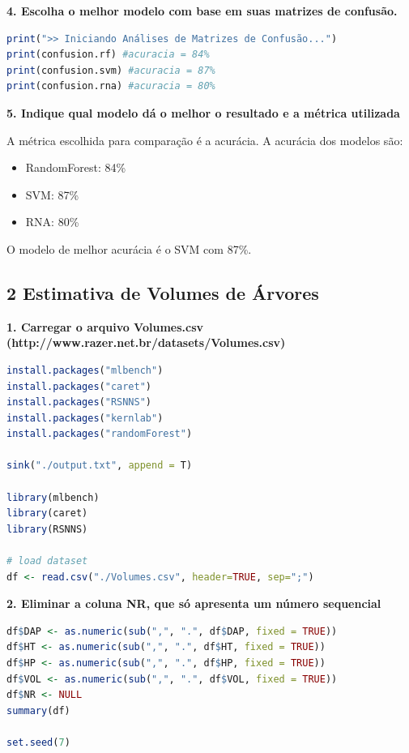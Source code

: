 \begin{adjustwidth}{1em}{}
\textbf{4. Escolha o melhor modelo com base em suas matrizes de confusão. }
\end{adjustwidth}
\begin{lstlisting}[language=R, style=input]
print(">> Iniciando Análises de Matrizes de Confusão...")
print(confusion.rf) #acuracia = 84%
print(confusion.svm) #acuracia = 87%
print(confusion.rna) #acuracia = 80%
\end{lstlisting}

\begin{adjustwidth}{1em}{}
\textbf{5. Indique qual modelo dá o melhor o resultado e a métrica utilizada}
\end{adjustwidth}
A métrica escolhida para comparação é a acurácia. A acurácia dos modelos são:
\begin{itemize}
    \item RandomForest: 84\%
    \item SVM: 87\%
    \item RNA: 80\%
\end{itemize}

O modelo de melhor acurácia é o SVM com 87\%.



\subsection*{\textbf{2 Estimativa de Volumes de Árvores}}
\begin{adjustwidth}{1em}{}
\textbf{1. Carregar o arquivo Volumes.csv (http://www.razer.net.br/datasets/Volumes.csv)}
\end{adjustwidth}
\begin{lstlisting}[language=R, style=input]
install.packages("mlbench")
install.packages("caret")
install.packages("RSNNS")
install.packages("kernlab")
install.packages("randomForest")

sink("./output.txt", append = T)

library(mlbench)
library(caret)
library(RSNNS)

# load dataset
df <- read.csv("./Volumes.csv", header=TRUE, sep=";")
\end{lstlisting}

\begin{adjustwidth}{1em}{}
\textbf{2. Eliminar a coluna NR, que só apresenta um número sequencial}
\end{adjustwidth}
\begin{lstlisting}[language=R, style=input]
df$DAP <- as.numeric(sub(",", ".", df$DAP, fixed = TRUE))
df$HT <- as.numeric(sub(",", ".", df$HT, fixed = TRUE))
df$HP <- as.numeric(sub(",", ".", df$HP, fixed = TRUE))
df$VOL <- as.numeric(sub(",", ".", df$VOL, fixed = TRUE))
df$NR <- NULL
summary(df)

set.seed(7)
\end{lstlisting}

